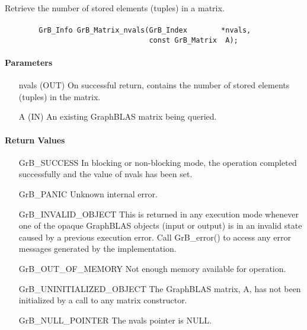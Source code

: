 Retrieve the number of stored elements (tuples) in a matrix.

\paragraph{\syntax}

\begin{verbatim}
        GrB_Info GrB_Matrix_nvals(GrB_Index        *nvals,
                                  const GrB_Matrix  A);
\end{verbatim}

\paragraph{Parameters}

\begin{itemize}[leftmargin=1.1in]
    \item[{\sf nvals}] ({\sf OUT}) On successful return, contains the number of 
    stored elements (tuples) in the matrix.
    \item[{\sf A}] ({\sf IN}) An existing GraphBLAS matrix being queried.
\end{itemize}

\paragraph{Return Values}

\begin{itemize}[leftmargin=2.1in]
    \item[{\sf GrB\_SUCCESS}]  In blocking or non-blocking mode, the operation 
    completed successfully and the value of {\sf nvals} has been set. 

    \item[{\sf GrB\_PANIC}]    Unknown internal error.
    
    \item[{\sf GrB\_INVALID\_OBJECT}] This is returned in any execution mode 
    whenever one of the opaque GraphBLAS objects (input or output) is in an invalid 
    state caused by a previous execution error.  Call {\sf GrB\_error()} to access 
    any error messages generated by the implementation.

    \item[{\sf GrB\_OUT\_OF\_MEMORY}] Not enough memory available for operation.
    
    \item[{\sf GrB\_UNINITIALIZED\_OBJECT}]  The GraphBLAS matrix, {\sf A}, has 
    not been initialized by a call to any matrix constructor.
    
    \item[{\sf GrB\_NULL\_POINTER}]  The {\sf nvals} pointer is {\sf NULL}.
\end{itemize}

